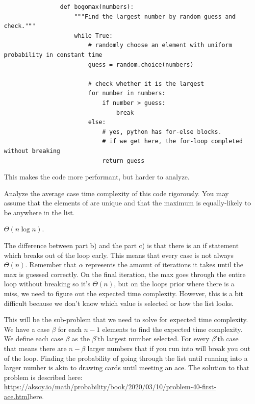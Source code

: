 \begin{prob}
\begin{subprobset}
\begin{subprob}
\begin{verbatim}
                def bogomax(numbers):
                    """Find the largest number by random guess and check."""
                    while True:
                        # randomly choose an element with uniform probability in constant time
                        guess = random.choice(numbers)

                        # check whether it is the largest
                        for number in numbers:
                            if number > guess:
                                break
                        else:
                            # yes, python has for-else blocks.
                            # if we get here, the for-loop completed without breaking
                            return guess
            \end{verbatim}

            This makes the code more performant, but harder to analyze.

            Analyze the average case time complexity of this code rigorously.
            You may assume that the elements of  are unique and
            that the maximum is equally-likely to be anywhere in the list.

            \begin{soln}
                $\Theta(n \log n)$.

                The difference between part b) and the part c) is that there is an if statement 
                which breaks out of the loop early. This means that every case is not always $\Theta(n)$.
                Remember that $\alpha$ represents the amount of iterations it takes until the max is guessed
                correctly. On the final iteration, the max goes through the entire loop without breaking so 
                it's $\Theta(n)$, but on the loops prior where there is a miss, we need to figure out the 
                expected time complexity. However, this is a bit difficult because we don't know which value 
                is selected or how the list looks.

                This will be the sub-problem that we need to solve for expected time complexity. We have a 
                case $\beta$ for each $n-1$ elements to find the expected time complexity. We define each case 
                $\beta$ as the $\beta$'th largest number selected. For every $\beta$'th case that means there 
                are $n - \beta$ larger numbers that if you run into will break you out of the loop. Finding the 
                probability of going through the list until running into a larger number is akin to drawing cards 
                until meeting an ace. The solution to that problem is described here:
                \url{https://aksoy.io/math/probability/book/2020/03/10/problem-40-first-ace.html}{here}. 


\end{soln}
\end{subprob}
\end{subprobset}
\end{prob}
